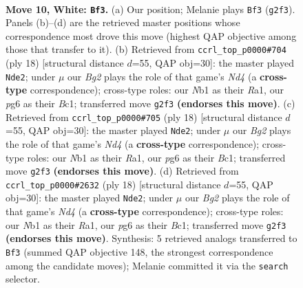 \documentclass[11pt]{article}
\begin{document}
\clearpage

\begin{figure}[p]\centering
\begin{subfigure}{0.46\textwidth}\centering
\resizebox{\linewidth}{!}{%
\newchessgame
\chessboard[
  setfen={r1bq1rk1/ppp1bp1p/2n1p1p1/3n4/2NP4/4P1P1/PP3PBP/RNBQ1RK1 w - - 1 10},
  showmover=false,
  pgfstyle=straightmove, color=movearrow, markmove={g2-f3}
]}
\caption{}
\end{subfigure}\hfill
\begin{subfigure}{0.46\textwidth}\centering
\resizebox{\linewidth}{!}{%
\newchessgame
\chessboard[
  setfen={r2q1rk1/pp1bppbp/2np1np1/8/2PNP3/2N3P1/PP3PBP/R1BQ1RK1 w - - 3 10},
  showmover=false,
  pgfstyle=straightmove, color=movearrow, markmove={d4-e2}
]}
\caption{}
\end{subfigure}
\\[4pt]
\begin{subfigure}{0.46\textwidth}\centering
\resizebox{\linewidth}{!}{%
\newchessgame
\chessboard[
  setfen={r2q1rk1/pp1bppbp/2np1np1/8/2PNP3/2N3P1/PP3PBP/R1BQ1RK1 w - - 3 10},
  showmover=false,
  pgfstyle=straightmove, color=movearrow, markmove={d4-e2}
]}
\caption{}
\end{subfigure}\hfill
\begin{subfigure}{0.46\textwidth}\centering
\resizebox{\linewidth}{!}{%
\newchessgame
\chessboard[
  setfen={r2q1rk1/pp1bppbp/2np1np1/8/2PNP3/2N3P1/PP3PBP/R1BQ1RK1 w - - 3 10},
  showmover=false,
  pgfstyle=straightmove, color=movearrow, markmove={d4-e2}
]}
\caption{}
\end{subfigure}
\caption{\textbf{Move 10, White: \texttt{Bf3}.} (a) Our position; Melanie plays \texttt{Bf3} (\texttt{g2f3}). Panels (b)--(d) are the retrieved master positions whose correspondence most drove this move (highest QAP objective among those that transfer to it). (b) Retrieved from \texttt{ccrl\_top\_p0000\#704} (ply 18) [structural distance $d$=55, QAP obj=30]: the master played \texttt{Nde2}; under $\mu$ our \emph{Bg2} plays the role of that game's \emph{Nd4} (a \textbf{cross-type} correspondence); cross-type roles: our \emph{N}b1 as their \emph{R}a1, our \emph{p}g6 as their \emph{B}c1; transferred move \texttt{g2f3} \textbf{(endorses this move)}. (c) Retrieved from \texttt{ccrl\_top\_p0000\#705} (ply 18) [structural distance $d$=55, QAP obj=30]: the master played \texttt{Nde2}; under $\mu$ our \emph{Bg2} plays the role of that game's \emph{Nd4} (a \textbf{cross-type} correspondence); cross-type roles: our \emph{N}b1 as their \emph{R}a1, our \emph{p}g6 as their \emph{B}c1; transferred move \texttt{g2f3} \textbf{(endorses this move)}. (d) Retrieved from \texttt{ccrl\_top\_p0000\#2632} (ply 18) [structural distance $d$=55, QAP obj=30]: the master played \texttt{Nde2}; under $\mu$ our \emph{Bg2} plays the role of that game's \emph{Nd4} (a \textbf{cross-type} correspondence); cross-type roles: our \emph{N}b1 as their \emph{R}a1, our \emph{p}g6 as their \emph{B}c1; transferred move \texttt{g2f3} \textbf{(endorses this move)}. Synthesis: 5 retrieved analogs transferred to \texttt{Bf3} (summed QAP objective 148, the strongest correspondence among the candidate moves); Melanie committed it via the \texttt{search} selector.}

\end{figure}
\end{document}
